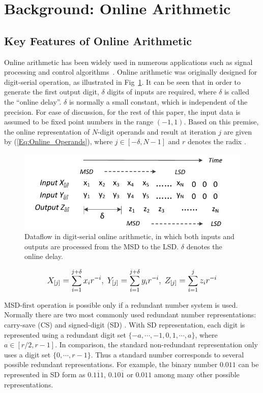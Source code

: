 \documentclass[conference]{IEEEtran}
\begin{document}
\section{Background: Online Arithmetic}\label{Sec:Background}
\subsection{Key Features of Online Arithmetic}

Online arithmetic has been widely used in numerous applications such as signal processing and control algorithms~\cite{Online_FPGADSP,Online_Control}. Online arithmetic was originally designed for digit-serial operation, as illustrated in Fig~\ref{Fig:OnlineDataFlow}. It can be seen that in order to generate the first output digit, $\delta$ digits of inputs are required, where $\delta$ is called the ``online delay''. $\delta$ is normally a small constant, which is independent of the precision. For ease of discussion, for the rest of this paper, the input data is assumed to be fixed point numbers in the range $(-1,1)$. Based on this premise, the online representation of $N$-digit operands and result at iteration $j$ are given by (\ref{Eq:Online_Operands}), where $j\in[-\delta,N-1]$ and $r$ denotes the radix \cite{Ercegovac_Book}.
%
\begin{figure}[htbp]
  \centering
  \includegraphics[width=.48\textwidth]{./Figures/OnlineArithmetic_DataFlow.pdf}
  \vspace{-4ex}
  \caption{Dataflow in digit-serial online arithmetic, in which both inputs and outputs are processed from the MSD to the LSD. $\delta$ denotes the online delay.}
  \vspace{-1ex}
  \label{Fig:OnlineDataFlow}
\end{figure}
%
\begin{eqnarray}\label{Eq:Online_Operands}
\footnotesize
  X_{[j]}=\sum_{i=1}^{j+\delta}x_ir^{-i},~Y_{[j]}=\sum_{i=1}^{j+\delta}y_ir^{-i},~Z_{[j]}=\sum_{i=1}^{j}z_ir^{-i}
\normalsize
\end{eqnarray}

MSD-first operation is possible only if a redundant number system is used. Normally there are two most commonly used redundant number representations: carry-save (CS) \cite{CSadder} and signed-digit (SD) \cite{RedundantNumber}. With SD representation, each digit is represented using a redundant digit set $\{-a, \cdots,-1,0, 1, \cdots, a\}$, where $a\in[r/2,r-1]$. In comparison, the standard non-redundant representation only uses a digit set $\{0,\cdots,r-1\}$. Thus a standard number corresponds to several possible redundant representations. For example, the binary number $0.011$ can be represented in SD form as $0.1\overline{1}1$, $0.10\overline{1}$ or $0.011$ among many other possible representations.
\end{document}
